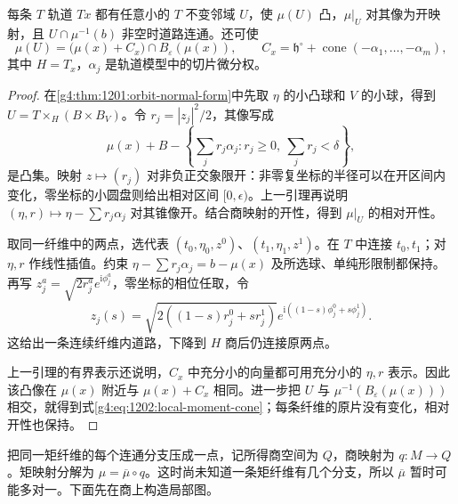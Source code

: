 \begin{lemma}\label{g4:lem:1202:local-convex-fibres}
	每条 \(T\) 轨道 \(Tx\) 都有任意小的 \(T\) 不变邻域 \(U\)，使 \(\mu(U)\) 凸，\(\mu|_U\) 对其像为开映射，且 \(U\cap\mu^{-1}(b)\) 非空时道路连通。还可使
	\begin{equation}\label{g4:eq:1202:local-moment-cone}
		\mu(U)=\bigl(\mu(x)+C_x\bigr)\cap B_\varepsilon(\mu(x)),
		\qquad
		C_x=\mathfrak h^\circ+
		\operatorname{cone}(-\alpha_1,\ldots,-\alpha_m),
	\end{equation}
	其中 \(H=T_x\)，\(\alpha_j\) 是轨道模型中的切片微分权。
\end{lemma}
\begin{proof}
	在\cref{g4:thm:1201:orbit-normal-form}中先取 \(\eta\) 的小凸球和 \(V\) 的小球，得到 \(U=T\times_H(B\times B_V)\)。令 \(r_j=|z_j|^2/2\)，其像写成
	\[
		\mu(x)+B-\left\{\sum_jr_j\alpha_j:
		r_j\geq0,\ \sum_jr_j<\delta\right\},
	\]
	是凸集。映射 \(z\mapsto(r_j)\) 对非负正交象限开：非零复坐标的半径可以在开区间内变化，零坐标的小圆盘则给出相对区间 \([0,\epsilon)\)。上一引理再说明 \((\eta,r)\mapsto\eta-\sum r_j\alpha_j\) 对其锥像开。结合商映射的开性，得到 \(\mu|_U\) 的相对开性。

	取同一纤维中的两点，选代表 \((t_0,\eta_0,z^0)\)、\((t_1,\eta_1,z^1)\)。在 \(T\) 中连接 \(t_0,t_1\)；对 \(\eta,r\) 作线性插值。约束 \(\eta-\sum r_j\alpha_j=b-\mu(x)\) 及所选球、单纯形限制都保持。再写 \(z_j^a=\sqrt{2r_j^a}e^{\mathrm i\phi_j^a}\)，零坐标的相位任取，令
	\[
		z_j(s)=\sqrt{2((1-s)r_j^0+sr_j^1)}
		e^{\mathrm i((1-s)\phi_j^0+s\phi_j^1)}.
	\]
	这给出一条连续纤维内道路，下降到 \(H\) 商后仍连接原两点。

	上一引理的有界表示还说明，\(C_x\) 中充分小的向量都可用充分小的 \(\eta,r\) 表示。因此该凸像在 \(\mu(x)\) 附近与 \(\mu(x)+C_x\) 相同。进一步把 \(U\) 与 \(\mu^{-1}(B_\varepsilon(\mu(x)))\) 相交，就得到式\eqref{g4:eq:1202:local-moment-cone}；每条纤维的原片没有变化，相对开性也保持。
\end{proof}

把同一矩纤维的每个连通分支压成一点，记所得商空间为 \(Q\)，商映射为 \(q:M\to Q\)。矩映射分解为 \(\mu=\overline\mu\circ q\)。这时尚未知道一条矩纤维有几个分支，所以 \(\overline\mu\) 暂时可能多对一。下面先在商上构造局部图。

